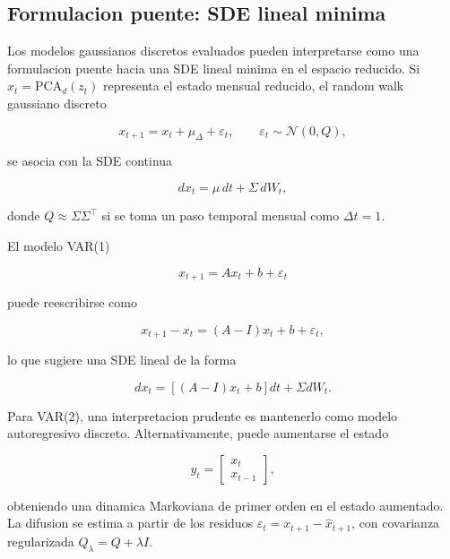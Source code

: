 \documentclass[12pt,letterpaper]{article}
\begin{document}
\subsection{Formulacion puente: SDE lineal minima}

Los modelos gaussianos discretos evaluados pueden interpretarse como una formulacion puente hacia una SDE lineal minima en el espacio reducido. Si $x_t=\mathrm{PCA}_d(z_t)$ representa el estado mensual reducido, el random walk gaussiano discreto

\begin{equation}
    x_{t+1}=x_t+\mu_\Delta+\varepsilon_t,
    \qquad \varepsilon_t\sim\mathcal{N}(0,Q),
\end{equation}

se asocia con la SDE continua

\begin{equation}
    dx_t=\mu\,dt+\Sigma\,dW_t,
\end{equation}

donde $Q\approx \Sigma\Sigma^\top$ si se toma un paso temporal mensual como $\Delta t=1$.

El modelo VAR(1)

\begin{equation}
    x_{t+1}=Ax_t+b+\varepsilon_t
\end{equation}

puede reescribirse como

\begin{equation}
    x_{t+1}-x_t=(A-I)x_t+b+\varepsilon_t,
\end{equation}

lo que sugiere una SDE lineal de la forma

\begin{equation}
    dx_t=\left[(A-I)x_t+b\right]dt+\Sigma dW_t.
\end{equation}

Para VAR(2), una interpretacion prudente es mantenerlo como modelo autoregresivo discreto. Alternativamente, puede aumentarse el estado

\begin{equation}
    y_t=
    \begin{bmatrix}
    x_t\\
    x_{t-1}
    \end{bmatrix},
\end{equation}

obteniendo una dinamica Markoviana de primer orden en el estado aumentado. La difusion se estima a partir de los residuos $\varepsilon_t=x_{t+1}-\hat{x}_{t+1}$, con covarianza regularizada $Q_\lambda=Q+\lambda I$.
\end{document}

